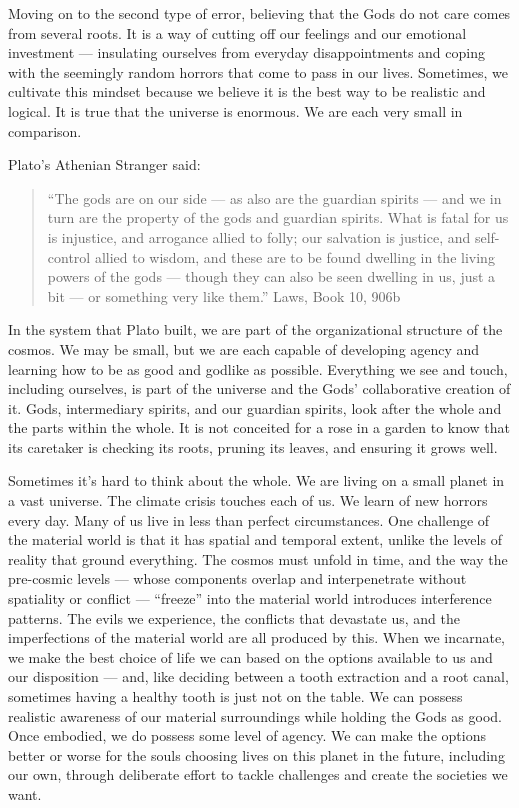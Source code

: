 \documentclass[
]{book}
\begin{document}
Moving on to the second type of error, believing that the Gods do not care comes from several roots. It is a way of cutting off our feelings and our emotional investment --- insulating ourselves from everyday disappointments and coping with the seemingly random horrors that come to pass in our lives. Sometimes, we cultivate this mindset because we believe it is the best way to be realistic and logical. It is true that the universe is enormous. We are each very small in comparison.

Plato's Athenian Stranger said:

\begin{quote}
``The gods are on our side --- as also are the guardian spirits --- and we in turn are the property of the gods and guardian spirits. What is fatal for us is injustice, and arrogance allied to folly; our salvation is justice, and self-control allied to wisdom, and these are to be found dwelling in the living powers of the gods --- though they can also be seen dwelling in us, just a bit --- or something very like them.'' Laws, Book 10, 906b
\end{quote}

In the system that Plato built, we are part of the organizational structure of the cosmos. We may be small, but we are each capable of developing agency and learning how to be as good and godlike as possible. Everything we see and touch, including ourselves, is part of the universe and the Gods' collaborative creation of it. Gods, intermediary spirits, and our guardian spirits, look after the whole and the parts within the whole. It is not conceited for a rose in a garden to know that its caretaker is checking its roots, pruning its leaves, and ensuring it grows well.

Sometimes it's hard to think about the whole. We are living on a small planet in a vast universe. The climate crisis touches each of us. We learn of new horrors every day. Many of us live in less than perfect circumstances. One challenge of the material world is that it has spatial and temporal extent, unlike the levels of reality that ground everything. The cosmos must unfold in time, and the way the pre-cosmic levels --- whose components overlap and interpenetrate without spatiality or conflict --- ``freeze'' into the material world introduces interference patterns. The evils we experience, the conflicts that devastate us, and the imperfections of the material world are all produced by this. When we incarnate, we make the best choice of life we can based on the options available to us and our disposition --- and, like deciding between a tooth extraction and a root canal, sometimes having a healthy tooth is just not on the table. We can possess realistic awareness of our material surroundings while holding the Gods as good. Once embodied, we do possess some level of agency. We can make the options better or worse for the souls choosing lives on this planet in the future, including our own, through deliberate effort to tackle challenges and create the societies we want.
\end{document}
